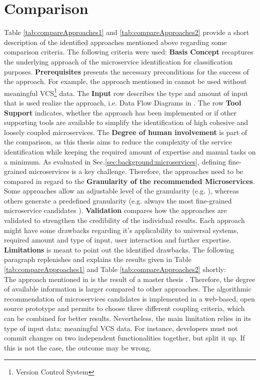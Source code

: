 \section{Comparison} 
\label{sec:stateOfTheArt:comparison}

Table \ref{tab:compareApproaches1} and \ref{tab:compareApproaches2} provide a short description of the identified approaches mentioned above regarding some comparison criteria. The following criteria were used: \textbf{Basis Concept} recaptures the underlying approach of the microservice identification for classification purposes. \textbf{Prerequisites} presents the necessary preconditions for the success of the approach. For example, the approach mentioned in \cite{ExtractionMazlami} cannot be used without meaningful VCS\footnote{Version Control System} data. The \textbf{Input} row describes the type and amount of input that is used realize the approach, i.e. Data Flow Diagrams in \cite{DataflowDrivenChen}. The row \textbf{Tool Support} indicates, whether the approach has been implemented or if other supporting tools are available to simplify the identification of high cohesive and loosely coupled microservices. The \textbf{Degree of human involvement} is part of the comparison, as this thesis aims to reduce the complexity of the service identification while keeping the required amount of expertise and manual tasks on a minimum. As evaluated in Sec.\ref{sec:background:microservices}, defining fine-grained microservices is a key challenge. Therefore, the approaches need to be compared in regard to the \textbf{Granularity of the recommended Microservices}. Some approaches allow an adjustable level of the granularity (e.g. \cite{ExtractionMazlami}), whereas others generate a predefined granularity (e.g. always the most fine-grained microservice candidates \cite{HeuristicsAlwis}). \textbf{Validation} compares how the approaches are validated to strengthen the credibility of the individual results. Each approach might have some drawbacks regarding it's applicability to universal systems, required amount and type of input, user interaction and further expertise. \textbf{Limitations} is meant to point out the identified drawbacks. The following paragraph replenishes and explains the results given in Table \ref{tab:compareApproaches1} and Table \ref{tab:compareApproaches2} shortly: \\

The approach mentioned in \cite{ExtractionMazlami} is the result of a master thesis \cite{Mazlami}. Therefore, the degree of available information is larger compared to other approaches. The algorithmic recommendation of microservices candidates is implemented in a web-based, open source prototype and permits to choose three different coupling criteria, which can be combined for better results. Nevertheless, the main limitation relies in its type of input data: meaningful VCS data. For instance, developers must not commit changes on two independent functionalities together, but split it up. If this is not the case, the outcome may be wrong. \\


